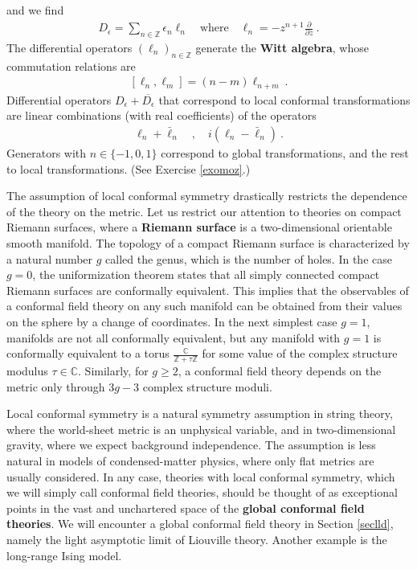 \documentclass[12pt, a4paper, notitlepage, twoside]{report}
\numberwithin{equation}{section}
\theoremstyle{break}
\begin{document}
and we find
\begin{align}
 D_\epsilon = \sum_{n\in {\mathbb{Z}}} \epsilon_n\ell_n  \quad \text{where} \quad \boxed{\ell_n= -z^{n+1}{\frac{\partial}{\partial z}}} \ .
\label{elln}
\end{align}
The differential operators $(\ell_n)_{n\in {\mathbb{Z}}}$ generate the \textbf{\boldmath Witt algebra}, whose commutation relations are
\begin{align}
 \boxed{[\ell_n,\ell_m]=(n-m)\ell_{n+m}}\ .
\end{align}
Differential operators $D_\epsilon +\overline{D_\epsilon}$ that correspond to local conformal transformations are linear combinations (with real coefficients) of the operators
\begin{align}
 \ell_n + \bar\ell_n \quad , \quad i(\ell_n-\bar\ell_n) \ .
 \label{ilml}
\end{align}
Generators with $n\in\{-1,0,1\}$ correspond to global transformations, and the rest to local transformations. (See Exercise \ref{exomoz}.) 

The assumption of local conformal symmetry drastically restricts the dependence of the theory on the metric.
Let us restrict our attention to theories on compact Riemann surfaces, where a \textbf{\boldmath Riemann surface} is a two-dimensional orientable smooth manifold.
The topology of a compact Riemann surface is characterized by a natural number $g$ called the genus, which is the number of holes.
In the case $g=0$, the uniformization theorem states that all simply connected compact Riemann surfaces are conformally equivalent. 
This implies that the observables of a conformal field theory on any such manifold can be obtained from their values on the sphere by a change of coordinates.
In the next simplest case $g=1$, manifolds are not all conformally equivalent, but any manifold with $g=1$ is conformally equivalent to a torus $\frac{{\mathbb{C}}}{{\mathbb{Z}}+\tau{\mathbb{Z}}}$ for some value of the
complex structure modulus $\tau \in {\mathbb{C}}$.
Similarly, for $g\geq 2$, a conformal field theory depends on the metric only through $3g-3$ complex structure moduli. 

Local conformal symmetry is a natural symmetry assumption in string theory, where the world-sheet metric is an unphysical variable, and in two-dimensional gravity, where we expect background independence.
The assumption is less natural in models of condensed-matter physics, where only flat metrics are usually considered.
In any case, theories with local conformal symmetry, which we will simply call conformal field theories, should be thought of as exceptional points in the vast and unchartered space of the \textbf{\boldmath global conformal field theories}.
We will encounter a global conformal field theory in Section \ref{seclld}, namely the light asymptotic limit of Liouville theory.
Another example is the long-range Ising model. 
\end{document}
